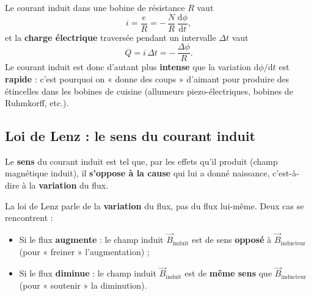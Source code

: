 \documentclass[11pt,a4paper]{article}
\newcommand{\Bvec}{\vec{B}}
\newcommand{\dd}{\mathrm{d}}
\begin{document}
\begin{remarque}
Le courant induit dans une bobine de résistance $R$ vaut
\[ i = \dfrac{e}{R} = -\,\dfrac{N}{R}\,\dfrac{\dd\phi}{\dd t}, \]
et la \textbf{charge électrique} traversée pendant un intervalle $\Delta t$ vaut
\[ Q = i\,\Delta t = -\,\dfrac{\Delta\phi}{R}. \]
Le courant induit est donc d'autant plus \textbf{intense} que la variation $\dd\phi/\dd t$ est
\textbf{rapide} : c'est pourquoi on « donne des coups » d'aimant pour produire des étincelles dans
les bobines de cuisine (allumeurs piezo-électriques, bobines de Ruhmkorff, etc.).
\end{remarque}

\subsection{Loi de Lenz : le sens du courant induit}

\begin{theoreme}
Le \textbf{sens} du courant induit est tel que, par les effets qu'il produit (champ magnétique
induit), il \textbf{s'oppose à la cause} qui lui a donné naissance, c'est-à-dire à la \textbf{variation}
du flux.
\end{theoreme}

\begin{attention}
La loi de Lenz parle de la \textbf{variation} du flux, pas du flux lui-même. Deux cas se
rencontrent :
\begin{itemize}[leftmargin=1.6em,topsep=2pt,itemsep=1pt]
  \item Si le flux \textbf{augmente} : le champ induit $\Bvec_{\text{induit}}$ est de sens
        \textbf{opposé} à $\Bvec_{\text{inducteur}}$ (pour « freiner » l'augmentation) ;
  \item Si le flux \textbf{diminue} : le champ induit $\Bvec_{\text{induit}}$ est de
        \textbf{même sens} que $\Bvec_{\text{inducteur}}$ (pour « soutenir » la diminution).
\end{itemize}
\end{attention}
\end{document}

